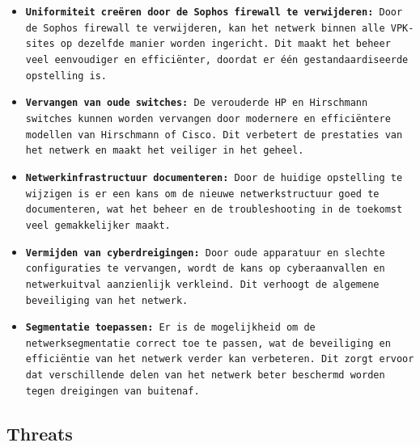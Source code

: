 \begin{itemize}
\item \texttt{\textbf{Uniformiteit creëren door de Sophos firewall te verwijderen:} Door de Sophos firewall te verwijderen, kan het netwerk binnen alle VPK-sites op dezelfde manier worden ingericht. Dit maakt het beheer veel eenvoudiger en efficiënter, doordat er één gestandaardiseerde opstelling is.}

\item \texttt{\textbf{Vervangen van oude switches:} De verouderde HP en Hirschmann switches kunnen worden vervangen door modernere en efficiëntere modellen van Hirschmann of Cisco. Dit verbetert de prestaties van het netwerk en maakt het veiliger in het geheel.}

\item \texttt{\textbf{Netwerkinfrastructuur documenteren:} Door de huidige opstelling te wijzigen is er een kans om de nieuwe netwerkstructuur goed te documenteren, wat het beheer en de troubleshooting in de toekomst veel gemakkelijker maakt.}

\item \texttt{\textbf{Vermijden van cyberdreigingen:} Door oude apparatuur en slechte configuraties te vervangen, wordt de kans op cyberaanvallen en netwerkuitval aanzienlijk verkleind. Dit verhoogt de algemene beveiliging van het netwerk.}

\item \texttt{\textbf{Segmentatie toepassen:} Er is de mogelijkheid om de netwerksegmentatie correct toe te passen, wat de beveiliging en efficiëntie van het netwerk verder kan verbeteren. Dit zorgt ervoor dat verschillende delen van het netwerk beter beschermd worden tegen dreigingen van buitenaf.}

\end{itemize}


\subsection{Threats}

